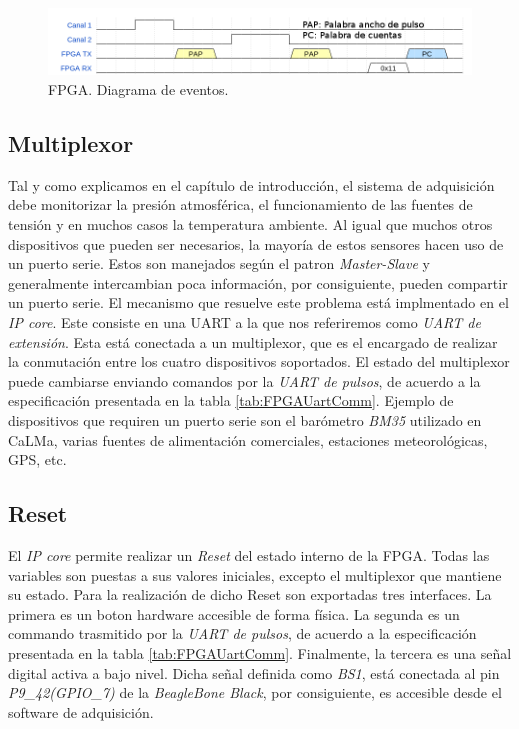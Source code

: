             \begin{figure}[h]
                \centering
                \includegraphics[keepaspectratio, width=1\textwidth]{./img/fpgawave.png}
                \caption{FPGA. Diagrama de eventos.}
                \label{fig:fpgaWave}
            \end{figure}
        \subsection{Multiplexor}
            Tal y como explicamos en el capítulo de introducción, el sistema de adquisición debe monitorizar la presión atmosférica, el
            funcionamiento de las fuentes de tensión y en muchos casos la temperatura ambiente. Al igual que muchos otros dispositivos que pueden
            ser necesarios, la mayoría de estos sensores hacen uso de un puerto serie. Estos son manejados según el patron \emph{Master-Slave} y
            generalmente intercambian poca información, por consiguiente, pueden compartir un puerto serie. El mecanismo que resuelve este
            problema está implmentado en el \emph{IP core}. Este consiste en una UART a la que nos referiremos como \emph{UART de extensión}. Esta
            está conectada a un multiplexor, que es el encargado de realizar la conmutación entre los cuatro dispositivos soportados. El estado
            del multiplexor puede cambiarse enviando comandos por la \emph{UART de pulsos}, de acuerdo a la especificación presentada en la tabla
            \ref{tab:FPGAUartComm}. Ejemplo de dispositivos que requiren un puerto serie son el barómetro \emph{BM35} utilizado en CaLMa, varias
            fuentes de alimentación comerciales, estaciones meteorológicas, GPS, etc.
        \subsection{Reset}
            \enlargethispage{2\baselineskip}
            El \emph{IP core} permite realizar un \emph{Reset} del estado interno de la FPGA. Todas las variables son puestas a sus valores iniciales,
            excepto el multiplexor que mantiene su estado. Para la realización de dicho Reset son exportadas tres interfaces. La primera es un
            boton hardware accesible de forma física. La segunda es un commando trasmitido por la \emph{UART de pulsos}, de acuerdo a la
            especificación presentada en la tabla \ref{tab:FPGAUartComm}. Finalmente, la tercera es una señal digital activa a bajo nivel. Dicha
            señal definida como \emph{BS1}, está conectada al pin \emph{P9\_42(GPIO\_7)} de la \emph{BeagleBone Black}, por consiguiente, es accesible
            desde el software de adquisición.

